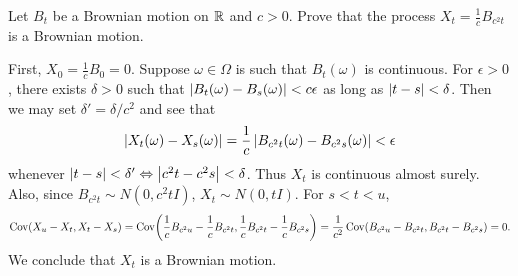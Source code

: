 \begin{exercise}{2.16}\label{ex:2.16}
    Let $B_t$ be a Brownian motion on $\mathbb{R}$ and $c>0$. Prove that the process 
    $X_t = \frac{1}{c}B_{c^2t}$ is a Brownian motion. 
\end{exercise}
\begin{solution}
    First, $X_0 = \frac{1}{c}B_0 = 0$. Suppose $\omega\in\Omega$ is such that 
    $B_t(\omega)$ is continuous. For $\epsilon>0$, there exists $\delta>0$ such 
    that $\left\lvert {B_{t}(\omega)-B_{s}(\omega)} \right\rvert<c\epsilon$ as long as $\left\lvert {t-s} \right\rvert<\delta$. 
    Then we may set $\delta' = \delta/c^2$ and see that 
    \begin{equation*}
        \left\lvert {X_t(\omega) - X_s(\omega)} \right\rvert = \frac{1}{c}\left\lvert {B_{c^2t}(\omega) - B_{c^2s}(\omega)} \right\rvert 
        < \epsilon
    \end{equation*}
    whenever $\left\lvert {t-s} \right\rvert<\delta'\Leftrightarrow \left\lvert {c^2t-c^2s} \right\rvert<\delta$. 
    Thus $X_t$ is continuous almost surely. Also, since $B_{c^2t}\sim N(0, c^2tI)$, 
    $X_t\sim N(0, tI)$. For $s<t<u$, 
    \begin{equation*}
        \Cov(X_u - X_t, X_t - X_s) = \Cov\pth{\frac{1}{c}B_{c^2u} - \frac{1}{c}B_{c^2t}, 
        \frac{1}{c}B_{c^2t} - \frac{1}{c}B_{c^2s}} 
        = \frac{1}{c^2}\Cov(B_{c^2u} - B_{c^2t}, B_{c^2t} - B_{c^2s}) = 0.
    \end{equation*}
    We conclude that $X_t$ is a Brownian motion.
\end{solution}

